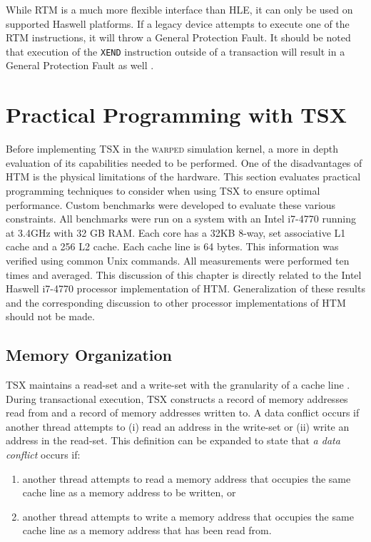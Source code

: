 \documentclass[11pt]{book}
\begin{document}
While RTM is a much more flexible interface than HLE, it can only be used on supported
Haswell platforms.  If a legacy device attempts to execute one of the RTM instructions, it
will throw a General Protection Fault.  It should be noted that execution of the
\texttt{XEND} instruction outside of a transaction will result in a General Protection
Fault as well \cite{intel_opt_man}.


\chapter{Practical Programming with TSX}

Before implementing TSX in the \textsc{warped} simulation kernel, a more in depth
evaluation of its capabilities needed to be performed.  One of the disadvantages of HTM is
the physical limitations of the hardware.  This section evaluates practical programming
techniques to consider when using TSX to ensure optimal performance.  Custom benchmarks
were developed to evaluate these various constraints.  All benchmarks were run on a system
with an Intel i7-4770 running at 3.4GHz with 32 GB RAM.  Each core has a 32KB 8-way, set
associative L1 cache and a 256 L2 cache.  Each cache line is 64 bytes.  This information
was verified using common Unix commands.  All measurements were performed ten times and
averaged.  This discussion of this chapter is directly related to the Intel Haswell
i7-4770 processor implementation of HTM.  Generalization of these results and the
corresponding discussion to other processor implementations of HTM should not be made. 

\section{Memory Organization}

TSX maintains a read-set and a write-set with the granularity of a cache line
\cite{intel_prog_ref}.  During transactional execution, TSX constructs a record of memory
addresses read from and a record of memory addresses written to.  A data conflict occurs
if another thread attempts to (i) read an address in the write-set or (ii) write an
address in the read-set.  This definition can be expanded to state that \emph{a data
  conflict} occurs if:

\vspace*{-\bigskipamount}
\begin{singlespace}
\begin{enumerate}
  \item another thread attempts to read a memory address that occupies the same cache line
    as a memory address to be written, or
  \item another thread attempts to write a memory address that occupies the same cache
    line as a memory address that has been read from.
\end{enumerate}
\end{singlespace}
\end{document}

